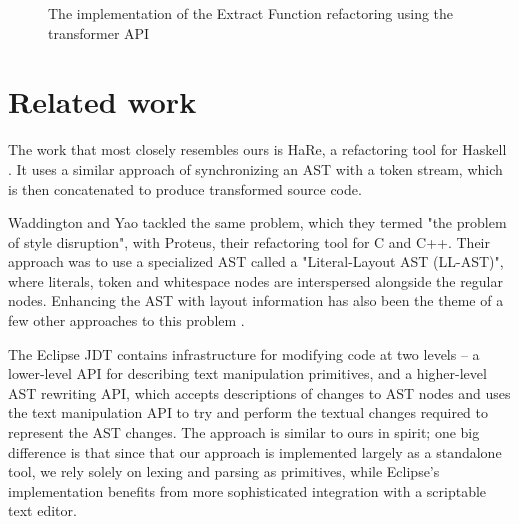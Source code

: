 \begin{figure}

\caption{The implementation of the Extract Function refactoring using the transformer API}
\label{Fig:ExtractFunction}
\end{figure}

\section{Related work}

The work that most closely resembles ours is HaRe, a refactoring tool for
Haskell \cite{HaRe}. It uses a similar approach of synchronizing an AST with a
token stream, which is then concatenated to produce transformed source code.

Waddington and Yao \cite{Proteus} tackled the same problem, which they termed
"the problem of style disruption", with Proteus, their refactoring tool for C
and C++. Their approach was to use a specialized AST called a "Literal-Layout
AST (LL-AST)", where literals, token and whitespace nodes are interspersed
alongside the regular nodes. Enhancing the AST with layout information has also
been the theme of a few other approaches to this problem \cite{RefactorErl}.


The Eclipse JDT contains infrastructure for modifying code at two levels -- a
lower-level API for describing text manipulation primitives, and a higher-level
AST rewriting API, which accepts descriptions of changes to AST nodes and uses
the text manipulation API to try and perform the textual changes required to
represent the AST changes. The approach is similar to ours in spirit; one big
difference is that since that our approach is implemented largely as a
standalone tool, we rely solely on lexing and parsing as primitives, while
Eclipse's implementation benefits from more sophisticated integration with a
scriptable text editor.
